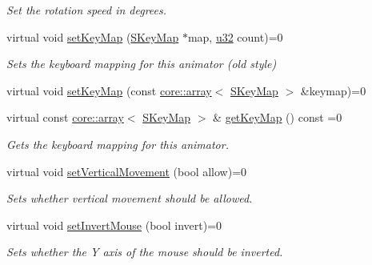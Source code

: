 \begin{DoxyCompactItemize}
\begin{DoxyCompactList}\small\item\em Set the rotation speed in degrees. \end{DoxyCompactList}\item 
virtual void \hyperlink{classirr_1_1scene_1_1ISceneNodeAnimatorCameraFPS_a449aba2c0047f895e417a872505c02ce}{set\+Key\+Map} (\hyperlink{structirr_1_1SKeyMap}{S\+Key\+Map} $\ast$map, \hyperlink{namespaceirr_a0416a53257075833e7002efd0a18e804}{u32} count)=0
\begin{DoxyCompactList}\small\item\em Sets the keyboard mapping for this animator (old style) \end{DoxyCompactList}\item 
virtual void \hyperlink{classirr_1_1scene_1_1ISceneNodeAnimatorCameraFPS_a9a76aeafb9fe79a13b7b128b3eb3b103}{set\+Key\+Map} (const \hyperlink{classirr_1_1core_1_1array}{core\+::array}$<$ \hyperlink{structirr_1_1SKeyMap}{S\+Key\+Map} $>$ \&keymap)=0
\item 
virtual const \hyperlink{classirr_1_1core_1_1array}{core\+::array}$<$ \hyperlink{structirr_1_1SKeyMap}{S\+Key\+Map} $>$ \& \hyperlink{classirr_1_1scene_1_1ISceneNodeAnimatorCameraFPS_a1ff58ce4ec848666f989cbb17367afe2}{get\+Key\+Map} () const  =0\hypertarget{classirr_1_1scene_1_1ISceneNodeAnimatorCameraFPS_a1ff58ce4ec848666f989cbb17367afe2}{}\label{classirr_1_1scene_1_1ISceneNodeAnimatorCameraFPS_a1ff58ce4ec848666f989cbb17367afe2}

\begin{DoxyCompactList}\small\item\em Gets the keyboard mapping for this animator. \end{DoxyCompactList}\item 
virtual void \hyperlink{classirr_1_1scene_1_1ISceneNodeAnimatorCameraFPS_a56cd5340472cc22e08ff17217af8af89}{set\+Vertical\+Movement} (bool allow)=0
\begin{DoxyCompactList}\small\item\em Sets whether vertical movement should be allowed. \end{DoxyCompactList}\item 
virtual void \hyperlink{classirr_1_1scene_1_1ISceneNodeAnimatorCameraFPS_abe634d0c7b03cc6f5adb9df3f04bacd5}{set\+Invert\+Mouse} (bool invert)=0
\begin{DoxyCompactList}\small\item\em Sets whether the Y axis of the mouse should be inverted. \end{DoxyCompactList}\end{DoxyCompactItemize}
